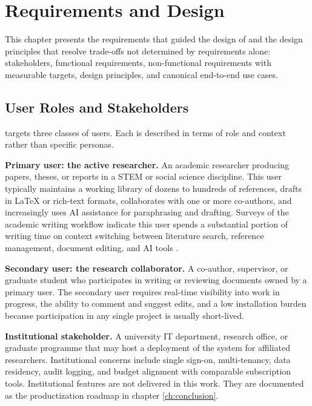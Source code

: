 \chapter{Requirements and Design}
\label{ch:requirements}

This chapter presents the requirements that guided the design of \sh{} and the design principles that resolve trade-offs not determined by requirements alone: stakeholders, functional requirements, non-functional requirements with measurable targets, design principles, and canonical end-to-end use cases.

\section{User Roles and Stakeholders}
\label{sec:req-stakeholders}

\sh{} targets three classes of users. Each is described in terms of role and context rather than specific personas.

\textbf{Primary user: the active researcher.} An academic researcher producing papers, theses, or reports in a STEM or social science discipline. This user typically maintains a working library of dozens to hundreds of references, drafts in LaTeX or rich-text formats, collaborates with one or more co-authors, and increasingly uses AI assistance for paraphrasing and drafting. Surveys of the academic writing workflow indicate this user spends a substantial portion of writing time on context switching between literature search, reference management, document editing, and AI tools \cite{khalifa2024aiwriting,springer2024fragmentation}.

\textbf{Secondary user: the research collaborator.} A co-author, supervisor, or graduate student who participates in writing or reviewing documents owned by a primary user. The secondary user requires real-time visibility into work in progress, the ability to comment and suggest edits, and a low installation burden because participation in any single project is usually short-lived.

\textbf{Institutional stakeholder.} A university IT department, research office, or graduate programme that may host a deployment of the system for affiliated researchers. Institutional concerns include single sign-on, multi-tenancy, data residency, audit logging, and budget alignment with comparable subscription tools. Institutional features are not delivered in this work. They are documented as the productization roadmap in chapter \ref{ch:conclusion}.

